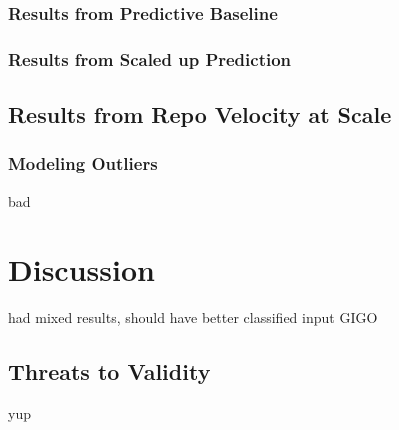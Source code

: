 \documentclass{article}
\begin{document}
\subsubsection{Results from Predictive Baseline}

\subsubsection{Results from Scaled up Prediction}

\subsection{Results from Repo Velocity at Scale}


\subsubsection{Modeling Outliers}

bad 

\section{Discussion}

had mixed results, should have better classified input GIGO

\subsection{Threats to Validity}

 yup



\end{document}
